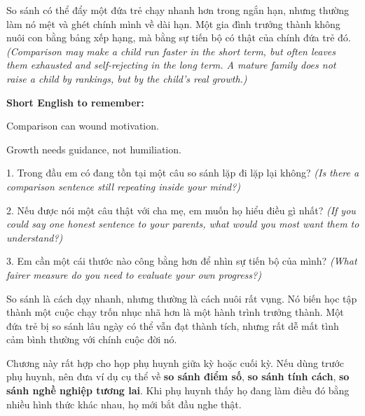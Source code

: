 \begin{baihoc}
So sánh có thể đẩy một đứa trẻ chạy nhanh hơn trong ngắn hạn, nhưng thường làm nó mệt và ghét chính mình về dài hạn. Một gia đình trưởng thành không nuôi con bằng bảng xếp hạng, mà bằng sự tiến bộ có thật của chính đứa trẻ đó.
\textit{(Comparison may make a child run faster in the short term, but often leaves them exhausted and self-rejecting in the long term. A mature family does not raise a child by rankings, but by the child's real growth.)}
\end{baihoc}

\begin{ghinhoanh}
\textbf{Short English to remember:}

Comparison can wound motivation.

Growth needs guidance, not humiliation.
\end{ghinhoanh}

\begin{tuhocnhanh}
1. Trong đầu em có đang tồn tại một câu so sánh lặp đi lặp lại không? \textit{(Is there a comparison sentence still repeating inside your mind?)}

2. Nếu được nói một câu thật với cha mẹ, em muốn họ hiểu điều gì nhất? \textit{(If you could say one honest sentence to your parents, what would you most want them to understand?)}

3. Em cần một cái thước nào công bằng hơn để nhìn sự tiến bộ của mình? \textit{(What fairer measure do you need to evaluate your own progress?)}
\end{tuhocnhanh}

\begin{tongketchuong}
So sánh là cách dạy nhanh, nhưng thường là cách nuôi rất vụng. Nó biến học tập thành một cuộc chạy trốn nhục nhã hơn là một hành trình trưởng thành. Một đứa trẻ bị so sánh lâu ngày có thể vẫn đạt thành tích, nhưng rất dễ mất tình cảm bình thường với chính cuộc đời nó.
\end{tongketchuong}

\begin{goigiaovien}
Chương này rất hợp cho họp phụ huynh giữa kỳ hoặc cuối kỳ. Nếu dùng trước phụ huynh, nên đưa ví dụ cụ thể về \textbf{so sánh điểm số}, \textbf{so sánh tính cách}, \textbf{so sánh nghề nghiệp tương lai}. Khi phụ huynh thấy họ đang làm điều đó bằng nhiều hình thức khác nhau, họ mới bắt đầu nghe thật.
\end{goigiaovien}

\ngancach